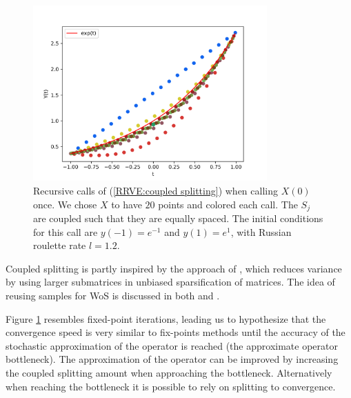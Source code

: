 \documentclass[a4paper,12pt]{article}
\begin{document}
\begin{figure}[h!]
  \centering
  \includegraphics[width=0.8\textwidth]{plots/coupled split.png}
  \caption{Recursive calls of (\ref{RRVE:coupled splitting}) when
  calling $X(0)$ once. We chose $X$ to have $20$ points and
  colored each call. The $S_{j}$ are coupled such that
  they are equally spaced.
  The initial conditions for this call are $y(-1)=e^{-1}$ and $y(1)=e^{1}$,
  with Russian roulette rate $l=1.2$. }
  \label{fig:coupled splitting}
\end{figure}



\begin{related}
  Coupled splitting is partly inspired by the approach
  of \cite{sabelfeld_sparsified_2009}, which reduces
  variance by using larger submatrices in unbiased sparsification
  of matrices. The idea
  of reusing samples for WoS is discussed in both
  \cite{miller_boundary_2023} and \cite{bakbouk_mean_2023}.
\end{related}

Figure \ref{fig:coupled splitting}
resembles fixed-point iterations, leading us to hypothesize
that the convergence
speed is very similar to fix-points methods until the accuracy
of the stochastic approximation of the operator is reached
(the approximate operator bottleneck). The approximation of the operator
can be improved by increasing the coupled splitting amount when
approaching the bottleneck. Alternatively when reaching
the bottleneck it is possible to rely on splitting to convergence.
\end{document}
